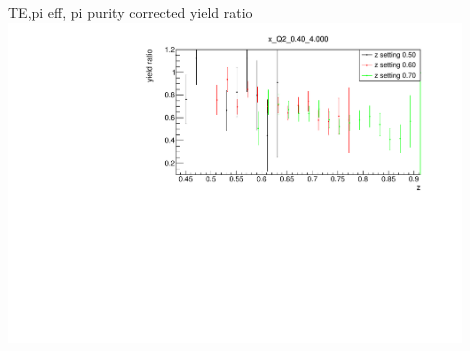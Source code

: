 \begin{frame}{TE,pi eff, pi purity corrected yield ratio}
\includegraphics[width = 0.9\textwidth]{results/yield/statistics_corr/x_Q2_0.40_4.000_ratio.pdf}
\end{frame}
